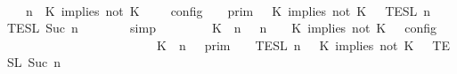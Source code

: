 \begin{isabellebody}
%
\isadelimproof
\ \ %
\endisadelimproof
%
\isatagproof
{}\isamarkupfalse%
\ {\isacharminus}\isanewline
\ \ \ \ \isamarkupfalse%
\ {\isacartoucheopen}{\isasymlbrakk}\ {\isasymGamma}{\isacharcomma}\ n\ {\isasymturnstile}\ {\isacharparenleft}K\ implies\ not\ K\ {\isacharhash}\ {\isasymPsi}\ {\isasymtriangleright}\ {\isasymPhi}\ {\isasymrbrakk}\isactrlsub c\isactrlsub o\isactrlsub n\isactrlsub f\isactrlsub i\isactrlsub g\ {\isacharequal}\ {\isasymlbrakk}{\isasymlbrakk}\ {\isasymGamma}\ {\isasymrbrakk}{\isasymrbrakk}\isactrlsub p\isactrlsub r\isactrlsub i\isactrlsub m\ {\isasyminter}\ {\isasymlbrakk}{\isasymlbrakk}\ {\isacharparenleft}K\ implies\ not\ K\ {\isacharhash}\ {\isasymPsi}\ {\isasymrbrakk}{\isasymrbrakk}\isactrlsub T\isactrlsub E\isactrlsub S\isactrlsub L\isactrlbsup {\isasymge}\ n\isactrlesup \ {\isasyminter}\ {\isasymlbrakk}{\isasymlbrakk}\ {\isasymPhi}\ {\isasymrbrakk}{\isasymrbrakk}\isactrlsub T\isactrlsub E\isactrlsub S\isactrlsub L\isactrlbsup {\isasymge}\ Suc\ n\isactrlesup {\isacartoucheclose}\isanewline
\ \ \ \ \ \ \isamarkupfalse%
\ simp\isanewline
\ \ \ \ \isamarkupfalse%
\ \isamarkupfalse%
\ {\isacartoucheopen}{\isasymlbrakk}\ {\isacharparenleft}{\isacharparenleft}K\ {\isasymnot}{\isasymUp}\ n{\isacharparenright}\ {\isacharhash}\ {\isasymGamma}{\isacharparenright}{\isacharcomma}\ n\ {\isasymturnstile}\ {\isasymPsi}\ {\isasymtriangleright}\ {\isacharparenleft}{\isacharparenleft}K\ implies\ not\ K\ {\isacharhash}\ {\isasymPhi}{\isacharparenright}\ {\isasymrbrakk}\isactrlsub c\isactrlsub o\isactrlsub n\isactrlsub f\isactrlsub i\isactrlsub g\isanewline
\ \ \ \ \ \ \ \ \ \ \ \ \ \ \ \ \ \ \ \ \ \ {\isacharequal}\ {\isasymlbrakk}{\isasymlbrakk}\ {\isacharparenleft}K\ {\isasymnot}{\isasymUp}\ n{\isacharparenright}\ {\isacharhash}\ {\isasymGamma}\ {\isasymrbrakk}{\isasymrbrakk}\isactrlsub p\isactrlsub r\isactrlsub i\isactrlsub m\ {\isasyminter}\ {\isasymlbrakk}{\isasymlbrakk}\ {\isasymPsi}\ {\isasymrbrakk}{\isasymrbrakk}\isactrlsub T\isactrlsub E\isactrlsub S\isactrlsub L\isactrlbsup {\isasymge}\ n\isactrlesup \ {\isasyminter}\ {\isasymlbrakk}{\isasymlbrakk}\ {\isacharparenleft}K\ implies\ not\ K\ {\isacharhash}\ {\isasymPhi}\ {\isasymrbrakk}{\isasymrbrakk}\isactrlsub T\isactrlsub E\isactrlsub S\isactrlsub L\isactrlbsup {\isasymge}\ Suc\ n\isactrlesup {\isacartoucheclose}\isanewline

\end{isabellebody}
